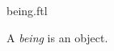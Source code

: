 \documentclass{stex}
\begin{document}
\begin{smodule}{being.ftl}



\begin{signature*}[forthel,for=being]
  A \emph{being} is an object.
\end{signature*}

\end{smodule}
\end{document}
